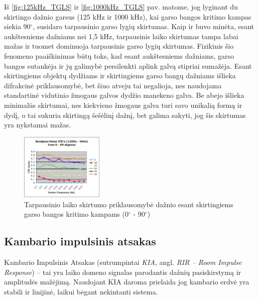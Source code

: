 \documentclass[]{vgtuef}
\begin{document}
Iš \ref{fig:125kHz_TGLS} ir \ref{fig:1000kHz_TGLS} pav. matome, jog lyginant du skirtingo dažnio garsus (125 kHz ir 1000 kHz), kai garso bangos kritimo kampas siekia 90$^\circ$, susidaro tarpausinio garso lygių skirtumas. Kaip ir buvo minėta, esant aukštesniems dažniams nei 1,5 kHz, tarpausinis laiko skirtumas tampa labai mažas ir tuomet dominuoja tarpausinis garso lygių skirtumas. Fizikinis šio fenomeno paaiškinimas būtų toks, kad esant aukštesniems dažniams, garso bangos sutankėja ir jų galimybė persilenkti aplink galvą stipriai sumažėja. Esant skirtingiems objektų dydžiams ir skirtingiems garso bangų dažniams išlieka difrakcinė priklausomybė, bet šiuo atveju tai negalioja, nes naudojama standartinė vidutinio žmogaus galvos dydžio manekeno galva. Be abejo išlieka minimalūs skirtumai, nes kiekvieno žmogaus galva turi savo unikalią formą ir dydį, o tai sukuria skirtingą šešėlinį dažnį, bet galima sakyti, jog šis skirtumas yra nykstamai mažas.

\begin{figure}[!h]
  \centering
  \includegraphics[width=150px]{img/ITD_freq.png}
  \caption{Tarpausinio laiko skirtumo priklausomybė dažnio esant skirtingiems garso bangos kritimo kampams (0$^\circ$ - 90$^\circ$)}
  \label{fig:ITD_freq}
\end{figure}


\subsection{Kambario impulsinis atsakas}

Kambario Impulsinis Atsakas (sutrumpintai \textit{KIA}, angl. \textit{RIR – Room Impulse Response}) – tai yra laiko domeno signalas parodantis dažnių pasiskirstymą ir amplitudės mažėjimą. Naudojant KIA daroma prielaida jog kambario erdvė yra stabili ir linijinė, laikui bėgant nekintanti sistema.
\end{document}
